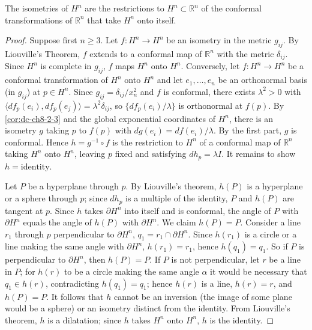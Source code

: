\begin{theorem}
  \label{thm:dc-ch8-5-3}


  The isometries of $H^n$ are the restrictions to $H^n\subset\mathbb{R}^n$ of the
  conformal transformations of $\mathbb{R}^n$ that take $H^n$ onto itself.
\end{theorem}
\begin{proof}
\sketch
  Suppose first $n\geq 3$. Let $f:H^n\to H^n$ be an isometry in the metric
  $g_{ij}$. By Liouville's Theorem, $f$ extends to a conformal map of $\mathbb{R}^n$
  with the metric $\delta_{ij}$. Since $H^n$ is complete in $g_{ij}$, $f$ maps $H^n$
  onto $H^n$. Conversely, let $f:H^n\to H^n$ be a conformal transformation of $H^n$
  onto $H^n$ and let $e_1,\dots,e_n$ be an orthonormal basis (in $g_{ij}$) at
  $p\in H^n$. Since $g_{ij}=\delta_{ij}/x_n^2$ and $f$ is conformal, there exists
  $\lambda^2>0$ with $\langle df_p(e_i),df_p(e_j)\rangle=\lambda^2\delta_{ij}$, so
  $\{df_p(e_i)/\lambda\}$ is orthonormal at $f(p)$. By
  \cref{cor:dc-ch8-2-3} and the global exponential coordinates of $H^n$, there is an isometry $g$ taking
  $p$ to $f(p)$ with $dg(e_i)=df(e_i)/\lambda$. By the first part, $g$ is conformal. Hence
  $h=g^{-1}\circ f$ is the restriction to $H^n$ of a conformal map of $\mathbb{R}^n$
  taking $H^n$ onto $H^n$, leaving $p$ fixed and satisfying $dh_p=\lambda I$. It
  remains to show $h=\text{identity}$.

  Let $P$ be a hyperplane through $p$. By Liouville's theorem, $h(P)$ is a hyperplane
  or a sphere through $p$; since $dh_p$ is a multiple of the identity, $P$ and $h(P)$
  are tangent at $p$. Since $h$ takes $\partial H^n$ into itself and is conformal,
  the angle of $P$ with $\partial H^n$ equals the angle of $h(P)$ with $\partial H^n$.
  We claim $h(P)=P$. Consider a line $r_1$ through $p$ perpendicular to
  $\partial H^n$, $q_1=r_1\cap\partial H^n$. Since $h(r_1)$ is a circle or a line
  making the same angle with $\partial H^n$, $h(r_1)=r_1$, hence $h(q_1)=q_1$. So if
  $P$ is perpendicular to $\partial H^n$, then $h(P)=P$. If $P$ is not perpendicular,
  let $r$ be a line in $P$; for $h(r)$ to be a circle making the same angle
  $\alpha$ it would be necessary that $q_1\in h(r)$, contradicting $h(q_1)=q_1$;
  hence $h(r)$ is a line, $h(r)=r$, and $h(P)=P$. It follows that $h$ cannot be an
  inversion (the image of some plane would be a sphere) or an isometry distinct from
  the identity. From Liouville's theorem, $h$ is a dilatation; since $h$ takes $H^n$
  onto $H^n$, $h$ is the identity.


\end{proof}
